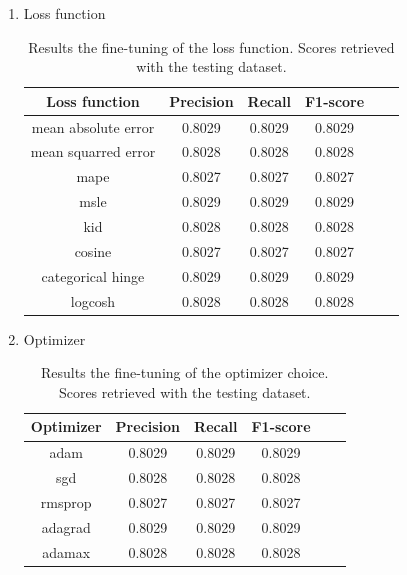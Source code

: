\begin{enumerate}
    \item Loss function
        \begin{table}[!h]
            \centering
            \begin{tabular}{c|c|c|c|c|c}
                \textbf{Loss function} & \textbf{Precision} & \textbf{Recall} & \textbf{F1-score} \\ \hline
                mean absolute error      &   	0.8029  &   	0.8029  &   	0.8029  \\
                mean squarred error        &   	0.8028  &   	0.8028  &   	0.8028  \\
                mape     &   	0.8027  &   	0.8027  &   	0.8027  \\
                msle         &   	0.8029  &   	0.8029  &   	0.8029  \\
                kid     &   	0.8028  &   	0.8028  &   	0.8028  \\
                cosine        &   	0.8027  &   	0.8027  &   	0.8027  \\
                categorical hinge        &    	0.8029  &   	0.8029  &   	0.8029  \\
                logcosh    &   	0.8028  &   	0.8028  &   	0.8028  \\
            \end{tabular}
            \caption{Results the fine-tuning of the loss function. Scores retrieved with the testing dataset.}
        \end{table}
        
        
    \item Optimizer
        \begin{table}[h]
            \centering
            \begin{tabular}{c|c|c|c|c|c}
                \textbf{Optimizer} & \textbf{Precision} & \textbf{Recall} & \textbf{F1-score} \\ \hline
                adam      &   	0.8029  &   	0.8029  &   	0.8029  \\
                sgd        &   	0.8028  &   	0.8028  &   	0.8028  \\
                rmsprop     &   	0.8027  &   	0.8027  &   	0.8027  \\
                adagrad         &   	0.8029  &   	0.8029  &   	0.8029  \\
                adamax     &   	0.8028  &   	0.8028  &   	0.8028  \\
            \end{tabular}
            \caption{Results the fine-tuning of the optimizer choice. Scores retrieved with the testing dataset.}
        \end{table}



\end{enumerate}
